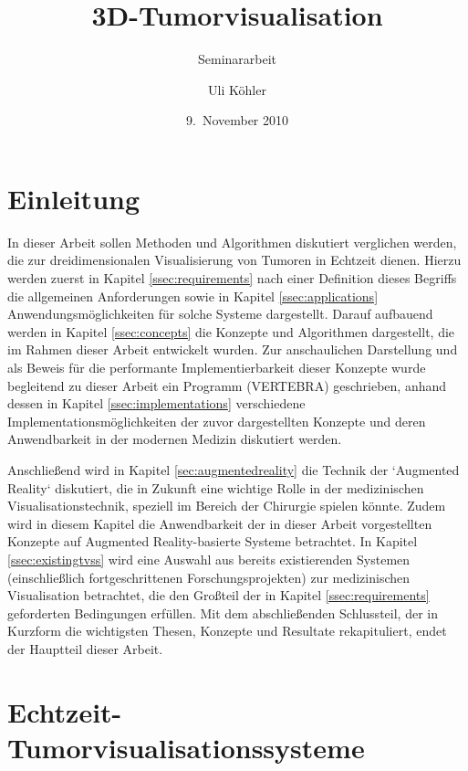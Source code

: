 \documentclass[a4paper,titlepage,12pt]{scrartcl}
\title{3D-Tumorvisualisation}
\subtitle{Seminararbeit}
\author{Uli Köhler}
\date{9.~November 2010}
\newtheorem[L]{boxedDefinition}{Definition}
\begin{document}
\maketitle\thispagestyle{empty}\newpage
\tableofcontents\thispagestyle{empty}\newpage
\section{Einleitung}\label{sec:introduction}
In dieser Arbeit sollen Methoden und Algorithmen diskutiert verglichen werden, die zur dreidimensionalen Visualisierung von Tumoren in Echtzeit dienen. Hierzu werden zuerst in Kapitel \vref{ssec:requirements} nach einer Definition dieses Begriffs die allgemeinen Anforderungen sowie in Kapitel \vref{ssec:applications} Anwendungsmöglichkeiten für solche Systeme dargestellt. Darauf aufbauend werden in Kapitel \vref{ssec:concepts} die Konzepte und Algorithmen dargestellt, die im Rahmen dieser Arbeit entwickelt wurden. Zur anschaulichen Darstellung und als Beweis für die performante Implementierbarkeit dieser Konzepte wurde begleitend zu dieser Arbeit ein Programm (\glqq VERTEBRA\grqq) geschrieben, anhand dessen in Kapitel \vref{ssec:implementations} verschiedene Implementationsmöglichkeiten der zuvor dargestellten Konzepte und deren Anwendbarkeit in der modernen Medizin diskutiert werden. 

Anschließend wird in Kapitel \vref{sec:augmentedreality} die Technik der `Augmented Reality` diskutiert, die in Zukunft eine wichtige Rolle in der medizinischen Visualisationstechnik, speziell im Bereich der Chirurgie spielen könnte. Zudem wird in diesem Kapitel die Anwendbarkeit der in dieser Arbeit vorgestellten Konzepte auf Augmented Reality-basierte Systeme betrachtet.
In Kapitel \vref{ssec:existingtvss} wird eine Auswahl aus bereits existierenden Systemen (einschließlich fortgeschrittenen Forschungsprojekten) zur medizinischen Visualisation betrachtet, die den Großteil der in Kapitel \ref{ssec:requirements} geforderten Bedingungen erfüllen.
Mit dem abschließenden Schlussteil, der in Kurzform die wichtigsten Thesen, Konzepte und Resultate rekapituliert, endet der Hauptteil dieser Arbeit.
\section{Echtzeit-Tumorvisualisationssysteme}\label{sec:vissystems}
\end{document}
